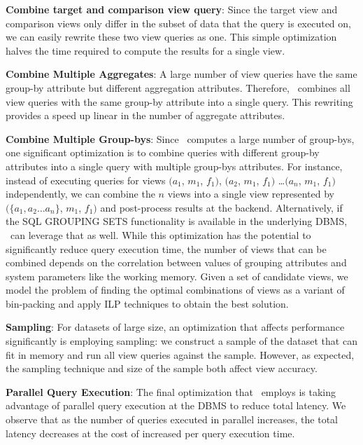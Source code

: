 \vspace{5 mm}

\squishlist
  \item {\bf  Combine target and comparison view query}: Since the target view
  and comparison views only differ in the subset of data that the query is
  executed on, we can easily rewrite these two view queries as one.
  This simple optimization halves the time required to compute the results for
  a single view. 
  \item {\bf  Combine Multiple Aggregates}: A large number of view
  queries have the same group-by attribute but different aggregation attributes.
  Therefore, \SeeDB\ combines all view queries with the same group-by attribute
  into a single query. This rewriting provides a speed up linear in the
  number of aggregate attributes.
  \item {\bf  Combine Multiple Group-bys}: 
  Since \SeeDB\ computes a large number of group-bys, one significant
  optimization is to combine queries with different
  group-by attributes into a single query with multiple group-bys attributes.
  For instance, instead of executing queries for views $(a_1$, $m_1$, $f_1)$,
  $(a_2$, $m_1$, $f_1)$ \ldots $(a_n$, $m_1$, $f_1)$ independently, 
  we can combine the $n$ views into a single view represented by
  $(\{a_1, a_2\ldots a_n\}$, $m_1$, $f_1)$ and post-process results at the
  backend. Alternatively, if the SQL GROUPING SETS functionality is available in
  the underlying DBMS, \SeeDB\ can leverage that as well. 
  While this optimization has the potential to significantly reduce query
  execution time, the number of views that can be combined depends
  on the correlation between values of grouping attributes and system parameters like the
  working memory. Given a set of candidate views, we model the
  problem of finding the optimal combinations of views as a variant of
  bin-packing and apply ILP techniques to obtain the best solution. \\
  \item {\bf  Sampling}: For datasets of large size, an optimization that
  affects performance significantly is employing sampling: we  
  construct a sample of the dataset
  that can fit in memory and run all view queries against the sample. However, as
  expected, the sampling technique and size of the sample both affect
  view accuracy. 
  \item {\bf  Parallel Query Execution}: The final optimization that
  \SeeDB\ employs is taking advantage of parallel query execution 
  at the DBMS to reduce total latency.
  We observe that as the number of queries executed in parallel
  increases, the total latency decreases at the cost of
  increased per query execution time.
\squishend

